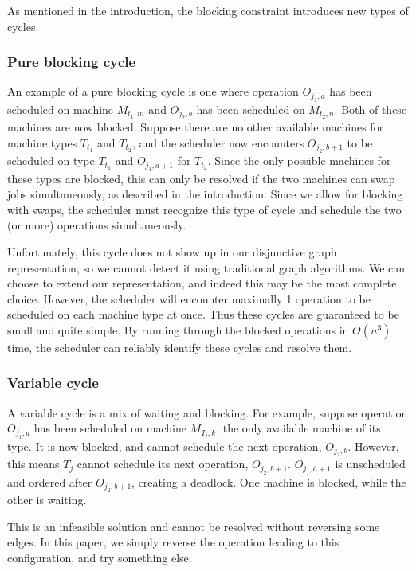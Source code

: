 \documentclass[a4paper,10pt]{article}
\begin{document}
As mentioned in the introduction, the blocking constraint introduces new types of cycles.

\subsubsection{Pure blocking cycle}

An example of a pure blocking cycle is one where operation $O_{j_1,a}$ has been scheduled on machine $M_{t_1,m}$ and $O_{j_2,b}$ has been scheduled on $M_{t_2,n}$. Both of these machines are now blocked. Suppose there are no other available machines for machine types $T_{t_1}$ and $T_{t_2}$, and the scheduler now encounters $O_{j_2,b+1}$ to be scheduled on type $T_{t_1}$ and $O_{j_1,a+1}$ for $T_{t_2}$. Since the only possible machines for these types are blocked, this can only be resolved if the two machines can swap jobs simultaneously, as described in the introduction. Since we allow for blocking with swaps, the scheduler must recognize this type of cycle and schedule the two (or more) operations simultaneously.

Unfortunately, this cycle does not show up in our disjunctive graph representation, so we cannot detect it using traditional graph algorithms. We can choose to extend our representation, and indeed this may be the most complete choice. However, the scheduler will encounter maximally 1 operation to be scheduled on each machine type at once. Thus these cycles are guaranteed to be small and quite simple. By running through the blocked operations in $O(n^3)$ time, the scheduler can reliably identify these cycles and resolve them.

\subsubsection{Variable cycle}

A variable cycle is a mix of waiting and blocking. For example, suppose operation $O_{j_1,a}$ has been scheduled on machine $M_{T_i, k}$, the only available machine of its type. It is now blocked, and cannot schedule the next operation, $O_{j_2,b}$. However, this means $T_j$ cannot schedule its next operation, $O_{j_2,b + 1}$. $O_{j_1,a + 1}$ is unscheduled and ordered after $O_{j_2,b + 1}$, creating a deadlock. One machine is blocked, while the other is waiting.

This is an infeasible solution and cannot be resolved without reversing some edges. In this paper, we simply reverse the operation leading to this configuration, and try something else.
\end{document}
